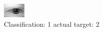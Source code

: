 \begin{figure}[h!]
\begin{center}
\includegraphics[width=0.60\columnwidth]{figures/ID447_class_1_target_2.png}
\end{center}
\caption{ Classification: 1 actual target: 2}
\label{fig:ID447_class_1_target_2}
\end{figure}
